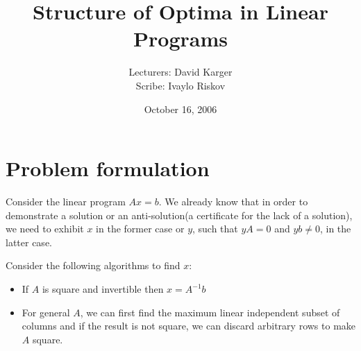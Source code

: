 \documentclass{article}
\begin{document}
\title{Structure of Optima in Linear Programs}
\date{October 16, 2006}
\author{Lecturers: David Karger\\ Scribe: Ivaylo Riskov}

%
%
%
%

%



\section{Problem formulation}

Consider the linear program $Ax=b$. We already know that in order
to demonstrate a solution or an anti-solution(a certificate for the lack of a solution), we need to exhibit $x$ in the former case or $y$, such that 
$yA=0$ and $yb \neq 0$, in the latter case.

Consider the following algorithms to find $x$:
\begin{itemize}
\item If $A$ is square and invertible then $x=A^{-1}b$
\item For general $A$, we can first find the maximum linear independent subset of columns  and if the result is not square, we can discard arbitrary rows to make $A$ square.
\end{itemize}
\end{document}
